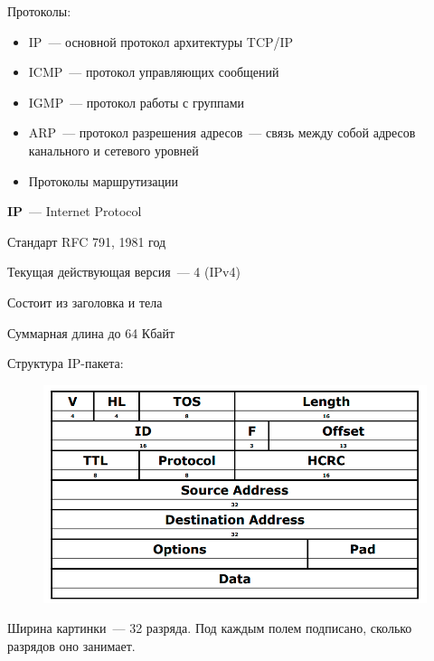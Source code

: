 
Протоколы:
\begin{itemize}
    \item IP~--- основной протокол архитектуры TCP/IP
    \item ICMP~--- протокол управляющих сообщений
    \item IGMP~--- протокол работы с группами
    \item ARP~--- протокол разрешения адресов~--- связь между собой адресов канального и сетевого уровней
    \item Протоколы маршрутизации
\end{itemize}


{\bf IP}~--- Internet Protocol

Стандарт RFC 791, 1981 год

Текущая действующая версия~--- 4 (IPv4)

Состоит из заголовка и тела

Суммарная длина до 64 Кбайт

Структура IP-пакета:

\begin{figure}[H]
  \centering
  \includegraphics[width=15cm]{images/02/01}
\end{figure}

Ширина картинки~--- 32 разряда. Под каждым полем подписано, сколько разрядов оно занимает.

